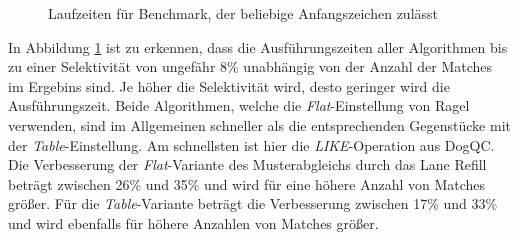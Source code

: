 \begin{figure}[ht]
	\centering
	\caption{Laufzeiten für Benchmark, der beliebige Anfangszeichen zulässt}
	\label{fig:regex_ANYdblpANY}
\end{figure}

In Abbildung \ref{fig:regex_ANYdblpANY} ist zu erkennen, dass die Ausführungszeiten aller Algorithmen bis zu einer Selektivität von ungefähr 8\% unabhängig von der Anzahl der Matches im Ergebins sind.
Je höher die Selektivität wird, desto geringer wird die Ausführungszeit.
Beide Algorithmen, welche die \emph{Flat}-Einstellung von Ragel verwenden, sind im Allgemeinen schneller als die entsprechenden Gegenstücke mit der \emph{Table}-Einstellung.
Am schnellsten ist hier die \emph{LIKE}-Operation aus DogQC.
Die Verbesserung der \emph{Flat}-Variante des Musterabgleichs durch das Lane Refill beträgt zwischen 26\% und 35\% und wird für eine höhere Anzahl von Matches größer.
Für die \emph{Table}-Variante beträgt die Verbesserung zwischen 17\% und 33\% und wird ebenfalls für höhere Anzahlen von Matches größer.

